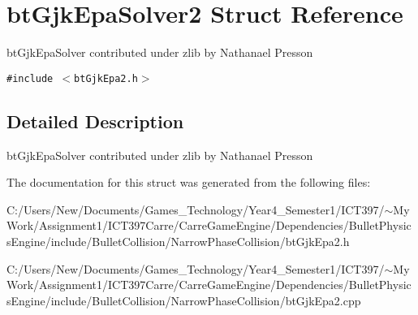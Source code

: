 \hypertarget{structbt_gjk_epa_solver2}{
\section{btGjkEpaSolver2 Struct Reference}
\label{structbt_gjk_epa_solver2}
}
btGjkEpaSolver contributed under zlib by Nathanael Presson  


{\tt \#include $<$btGjkEpa2.h$>$}



\subsection{Detailed Description}
btGjkEpaSolver contributed under zlib by Nathanael Presson 

The documentation for this struct was generated from the following files:\begin{CompactItemize}
\item 
C:/Users/New/Documents/Games\_\-Technology/Year4\_\-Semester1/ICT397/$\sim$My Work/Assignment1/ICT397Carre/CarreGameEngine/Dependencies/BulletPhysicsEngine/include/BulletCollision/NarrowPhaseCollision/btGjkEpa2.h\item 
C:/Users/New/Documents/Games\_\-Technology/Year4\_\-Semester1/ICT397/$\sim$My Work/Assignment1/ICT397Carre/CarreGameEngine/Dependencies/BulletPhysicsEngine/include/BulletCollision/NarrowPhaseCollision/btGjkEpa2.cpp\end{CompactItemize}
